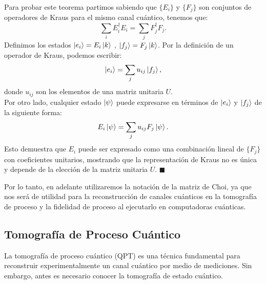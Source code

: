 \documentclass[letterpaper,12pt]{thesisECFM}
\theoremstyle{plain}
\theoremstyle{definition}
\theoremstyle{definition}
\theoremstyle{remark}
\newcommand{\1}{\mathbb{1}}
\begin{document}
Para probar este teorema partimos sabiendo que  $\{E_i\}$ y $\{F_j\}$ son conjuntos de operadores de Kraus para el mismo canal cuántico, tenemos que:
\begin{equation}
   \sum_i E_i^\dagger E_i = \sum_j F_j^\dagger F_j. 
\end{equation}
Definimos los estados $\ket{e_i} = E_i \ket{k}$ , $\ket{f_j} = F_j \ket{k}$. Por la definición de un operador de Kraus, podemos escribir:
\begin{equation}
  \ket{e_i} = \sum_j u_{ij} \ket{f_j},  
\end{equation} 
donde $u_{ij}$ son los elementos de una matriz unitaria $U$.\\
Por otro lado, cualquier estado $\ket{\psi}$ puede expresarse en términos de $\ket{e_i}$ y $\ket{f_j}$ de la siguiente forma:
\begin{equation}
E_i \ket{\psi} = \sum_j u_{ij} F_j \ket{\psi}.
\end{equation}
Esto demuestra que $E_i$ puede ser expresado como una combinación lineal de $\{F_j\}$ con coeficientes unitarios, mostrando que la representación de Kraus no es única y depende de la elección de la matriz unitaria $U$. $\blacksquare$

Por lo tanto, en adelante utilizaremos la notación de la matriz de Choi, ya que nos será de utilidad para la reconstrucción de canales cuánticos en la tomografía de proceso y la fidelidad de proceso al ejecutarlo en computadoras cuánticas.



\subsection{Tomografía de Proceso Cuántico} %
\label{sec:Tomo_proc}
La tomografía de proceso cuántico (QPT) es una técnica fundamental para reconstruir experimentalmente un canal cuántico por medio de mediciones. Sin embargo, antes es necesario conocer la tomografía de estado cuántico.  
\end{document}
